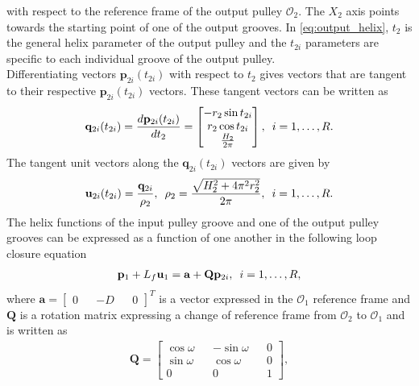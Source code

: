 \documentclass[10pt,cleanfoot]{asme2ej}
\newcommand{\hquad}{\hspace{0.5em}}
\begin{document}
  with respect to the reference frame of the output pulley $\mathcal{O}_2$. The $X_2$ axis points towards the starting point of one of the output grooves. In \eqref{eq:output_helix}, $t_2$ is the general helix parameter of the output pulley and the $t_{2i}$ parameters are specific to each individual groove of the output pulley. \\ 
  Differentiating vectors $\mathbf{p}_{2i}(t_{2i})$ with respect to $t_{2}$ gives vectors that are tangent to their respective $\mathbf{p}_{2i}(t_{2i})$ vectors. These tangent vectors can be written as 
  \begin{align}
      \mathbf{q}_{2i}(t_{2i}) = \frac{d \mathbf{p}_{2i}(t_{2i})}{dt_{2}}=\begin{bmatrix}
      -r_2\sin t_{2i}\\
      r_2\cos t_{2i}\\
      \frac{H_2}{2\pi}
      \end{bmatrix},\hspace{0.5em}i =1 ,\ldots , R.
  \end{align}
  The tangent unit vectors along the $\mathbf{q}_{2i}(t_{2i})$ vectors are given by
  \begin{align}
      \mathbf{u}_{2i}(t_{2i}) = \frac{\mathbf{q}_{2i}}{\rho_2},\hspace{0.5em} \rho_2 = \frac{\sqrt{H_2^2+4\pi^2r_2^2}}{2\pi}, \hspace{0.5em} i = 1 ,\ldots , R.
  \end{align}
  The helix functions of the input pulley groove and one of the output pulley grooves can be expressed as a function of one another in the following loop closure equation
  \begin{align}
      \mathbf{p}_1 + L_f\mathbf{u}_1 = \mathbf{a}+\mathbf{Q}\mathbf{p}_{2i}, \hquad i =1 ,\ldots , R,
      \label{eq:loop_closure}
  \end{align}
  where $\mathbf{a}=\begin{bmatrix}0 && -D  && 0\end{bmatrix}^T$ is a vector expressed in the $\mathcal{O}_1$ reference frame and $\mathbf{Q}$ is a rotation matrix expressing a change of reference frame from $\mathcal{O}_2$ to $\mathcal{O}_1$ and is written as \begin{align}
  \mathbf{Q} =
  \begin{bmatrix}
  \cos \omega && -\sin \omega && 0\\
  \sin \omega && \cos \omega && 0\\
  0 && 0 && 1
  \end{bmatrix},
  \end{align}
\end{document}
